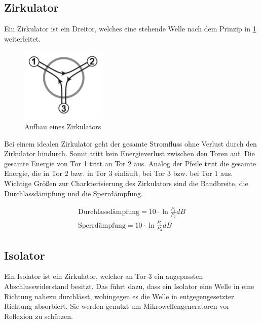 \subsection{Zirkulator}
Ein Zirkulator ist ein Dreitor, welches eine stehende Welle nach dem Prinzip in \cref{ZB} weiterleitet.
\begin{figure}[h!]
	\centering
	\includegraphics[scale = 1]{Zirk-Bild.PNG}
	\caption{Aufbau eines Zirkulators}
	\label{ZB}
\end{figure}
Bei einem idealen Zirkulator geht der gesamte Stromfluss ohne Verlust  durch den Zirkulator hindurch. Somit tritt kein Energieverlust zwischen den Toren auf. Die gesamte Energie von Tor 1 tritt an Tor 2 aus. Analog der Pfeile tritt die gesamte Energie, die in Tor 2 bzw. in Tor 3 einläuft, bei Tor 3 bzw. bei Tor 1 aus. Wichtige Größen zur Charkterisierung des Zirkulators sind die Bandbreite, die Durchlassdämpfung und die Sperrdämpfung.

\begin{align}
	\text{Durchlassdämpfung} = 10 \cdot \ln{\frac{P_1}{P_2}}dB \\
	\text{Sperrdämpfung} =  10 \cdot \ln{\frac{P_1}{P_3}}dB 
\end{align}

\subsection{Isolator}
Ein Isolator ist ein Zirkulator, welcher an Tor 3 ein angepassten Abschlusswiderstand besitzt. Das führt dazu, dass ein Isolator eine Welle in eine Richtung nahezu durchlässt, wohingegen es die Welle in entgegengesetzter Richtung absorbiert. Sie werden genutzt um Mikrowellengeneratoren vor Reflexion zu schützen.


